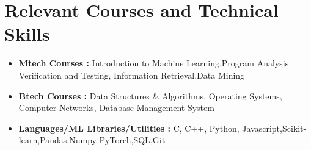 \documentclass[10.8pt, a4paper]{extarticle}
\newcommand{\shorterSection}[1]{\vspace{-10pt}\section{#1}}
\begin{document}


\shorterSection{Relevant Courses and Technical Skills}
\begin{itemize}
\item \textbf{Mtech Courses :} Introduction to Machine Learning,Program Analysis Verification and Testing, Information Retrieval,Data Mining
\item \textbf{Btech Courses :} Data Structures \& Algorithms, Operating Systems, Computer Networks, Database Management System
\item \textbf{Languages/ML Libraries/Utilities :} C, C++, Python, Javascript,Scikit-learn,Pandas,Numpy PyTorch,SQL,Git
\end{itemize}


\end{document}
